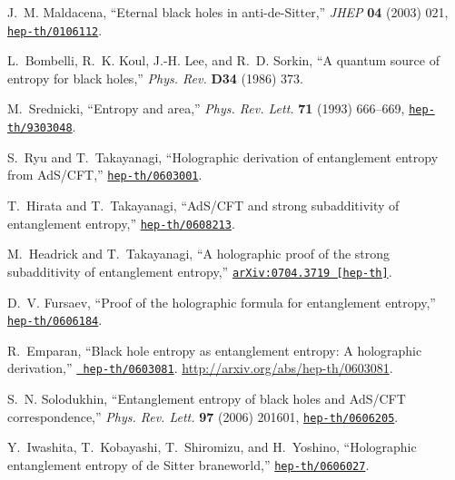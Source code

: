 \documentclass[12pt]{article}
\begin{document}
\begin{thebibliography}{10}
J.~M. Maldacena, ``Eternal black holes in anti-de-Sitter,'' {\em JHEP} {\bf 04}
  (2003)  021,
\href{http://arxiv.org/abs/hep-th/0106112}{{\tt hep-th/0106112}}.

L.~Bombelli, R.~K. Koul, J.-H. Lee, and R.~D. Sorkin, ``A quantum source of
  entropy for black holes,''
{\em Phys. Rev.} {\bf D34} (1986)  373.

M.~Srednicki, ``Entropy and area,'' {\em Phys. Rev. Lett.} {\bf 71} (1993)
  666--669,
\href{http://arxiv.org/abs/hep-th/9303048}{{\tt hep-th/9303048}}.

S.~Ryu and T.~Takayanagi, ``Holographic derivation of entanglement entropy from
  AdS/CFT,'' \href{http://arxiv.org/abs/hep-th/0603001}{{\tt hep-th/0603001}}.

T.~Hirata and T.~Takayanagi, ``AdS/CFT and strong subadditivity of entanglement
  entropy,'' \href{http://arxiv.org/abs/hep-th/0608213}{{\tt hep-th/0608213}}.

M.~Headrick and T.~Takayanagi, ``A holographic proof of the strong
  subadditivity of entanglement entropy,''
\href{http://arxiv.org/abs/arXiv:0704.3719 [hep-th]}{{\tt arXiv:0704.3719
  [hep-th]}}.

D.~V. Fursaev, ``Proof of the holographic formula for entanglement entropy,''
  \href{http://arxiv.org/abs/hep-th/0606184}{{\tt hep-th/0606184}}.

R.~Emparan, ``Black hole entropy as entanglement entropy: A holographic
  derivation,'' \href{http://arxiv.org/abs/hep-th/0603081}{{\tt
  hep-th/0603081}}.
\url{http://arxiv.org/abs/hep-th/0603081}.

S.~N. Solodukhin, ``Entanglement entropy of black holes and AdS/CFT
  correspondence,'' {\em Phys. Rev. Lett.} {\bf 97} (2006)  201601,
\href{http://arxiv.org/abs/hep-th/0606205}{{\tt hep-th/0606205}}.

Y.~Iwashita, T.~Kobayashi, T.~Shiromizu, and H.~Yoshino, ``Holographic
  entanglement entropy of de Sitter braneworld,''
  \href{http://arxiv.org/abs/hep-th/0606027}{{\tt hep-th/0606027}}.


\end{thebibliography}
\end{document}
